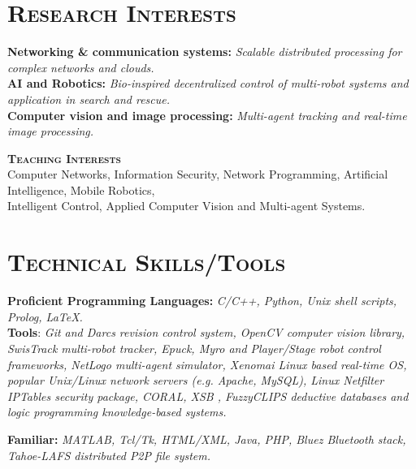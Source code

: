 \documentclass[notopicbreak,contbibnum,plain]{simplecv}
\begin{document}
\section{\textsc{Research Interests}}
\begin{topic}
\vspace*{-0.3cm}
 \item \textbf{Networking \& communication systems:} \textit{Scalable distributed processing for complex networks and clouds.}\\
\textbf{AI and Robotics:} \textit{Bio-inspired decentralized control of multi-robot systems and application in search and rescue.}\\    
\textbf{Computer vision and image processing:}\textit{ Multi-agent tracking and real-time image processing.}
\item \textbf{\textsc{Teaching Interests}}\\ Computer Networks, Information Security, Network Programming, Artificial Intelligence, Mobile Robotics,\\ Intelligent Control, Applied Computer Vision and Multi-agent Systems.
\vspace*{-0.25cm}
\end{topic}
\section{\textsc{Technical Skills/Tools}}
\vspace*{-0.3cm}
\begin{topic}
\item \textbf{Proficient Programming Languages:} \textit{C/C++, Python, Unix shell scripts, Prolog, LaTeX.}\\
	\textbf{Tools}: \textit{Git and Darcs revision control system, OpenCV computer vision library, SwisTrack multi-robot tracker, Epuck, Myro and Player/Stage robot control frameworks, NetLogo multi-agent simulator, Xenomai Linux based real-time OS, popular Unix/Linux network servers (e.g. Apache, MySQL), Linux Netfilter IPTables security package, CORAL, XSB , FuzzyCLIPS deductive databases and  logic programming knowledge-based systems.}
\vspace*{-0.1cm}
\item \textbf{Familiar:}
\textit{MATLAB, Tcl/Tk, HTML/XML, Java, PHP, Bluez Bluetooth stack, Tahoe-LAFS distributed P2P file system.}
\vspace*{-0.3cm}
\end{topic}
\vspace*{-0.3cm}
\end{document}
